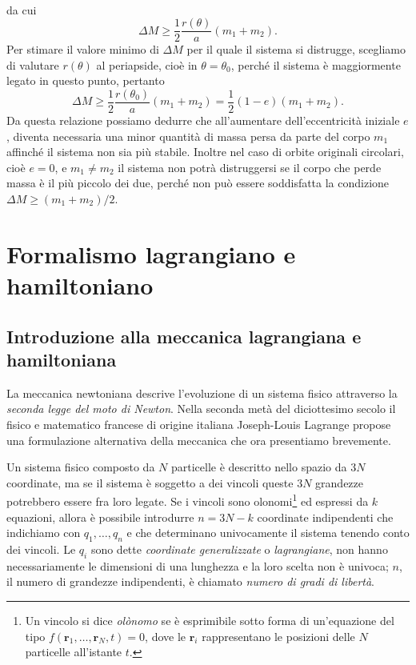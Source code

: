 {\begin{equation}
\begin{split}
  \end{split}
\end{equation}
da cui
\begin{equation}
  \Delta M \geq \frac{1}{2}\frac{r(\theta)}{a}(m_1 + m_2).
\end{equation}
Per stimare il valore minimo di $\Delta M$ per il quale il sistema si distrugge,
scegliamo di valutare $r(\theta)$ al periapside, cioè in $\theta = \theta_0$,
perché il sistema è maggiormente legato in questo punto, pertanto
\begin{equation}
    \Delta M \geq \frac{1}{2}\frac{r(\theta_0)}{a}(m_1 + m_2) =
    \frac{1}{2}(1 - e)(m_1 + m_2).
\end{equation}
Da questa relazione possiamo dedurre che all'aumentare dell'eccentricità
iniziale $e$, diventa necessaria una minor quantità di massa persa da parte del
corpo $m_1$ affinché il sistema non sia più stabile. Inoltre nel caso di orbite
originali circolari, cioè $e=0$, e $m_1 \neq m_2$ il sistema non potrà
distruggersi se il corpo che perde massa è il più piccolo dei due, perché non
può essere soddisfatta la condizione $\Delta M \geq (m_1 + m_2)/2$.

\section{Formalismo lagrangiano e hamiltoniano}
\label{sec:formalismo-lagrange}

\subsection{Introduzione alla meccanica lagrangiana e hamiltoniana}
\label{sec:intro-lagrange}

La meccanica newtoniana descrive l'evoluzione di un sistema fisico attraverso la
\emph{seconda legge del moto di Newton}. Nella seconda metà del diciottesimo
secolo il fisico e matematico francese di origine italiana Joseph-Louis Lagrange
propose una formulazione alternativa della meccanica che ora presentiamo
brevemente.

Un sistema fisico composto da $N$ particelle è descritto nello spazio da $3N$
coordinate, ma se il sistema è soggetto a dei vincoli queste $3N$ grandezze
potrebbero essere fra loro legate. Se i vincoli sono olonomi\footnote{Un vincolo
  si dice \emph{olònomo} se è esprimibile sotto forma di un'equazione del tipo
  $f(\bm{r}_1,\dots,\bm{r}_N,t)=0$, dove le $\bm{r}_i$ rappresentano le
  posizioni delle $N$ particelle all'istante $t$.} ed espressi da $k$ equazioni,
allora è possibile introdurre $n=3N-k$ coordinate indipendenti che indichiamo
con $q_1,\dots,q_n$ e che determinano univocamente il sistema tenendo conto dei
vincoli. Le $q_i$ sono dette \emph{coordinate generalizzate} o
\emph{lagrangiane}, non hanno necessariamente le dimensioni di una lunghezza e
la loro scelta non è univoca; $n$, il numero di grandezze indipendenti, è
chiamato \emph{numero di gradi di libertà}.

}
